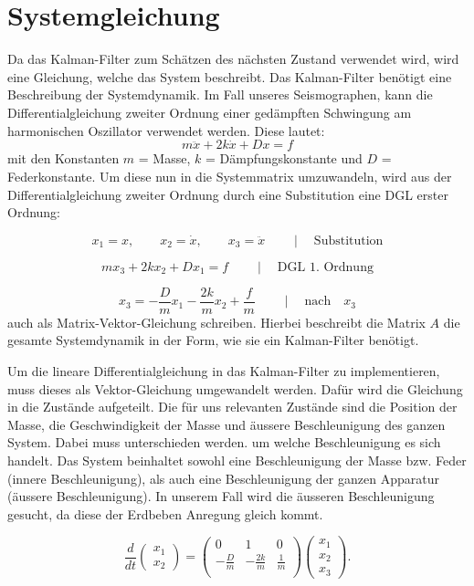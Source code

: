 \section{Systemgleichung}
Da das Kalman-Filter zum Schätzen des nächsten Zustand verwendet wird, wird eine Gleichung, welche das System beschreibt. Das Kalman-Filter benötigt eine Beschreibung der Systemdynamik. Im Fall unseres Seismographen, kann die Differentialgleichung zweiter Ordnung einer gedämpften Schwingung am harmonischen Oszillator verwendet werden. Diese lautet:
\begin{equation}
m\ddot x + 2k \dot x + Dx = f
\end{equation}
mit den Konstanten $m$ = Masse, $k$ = Dämpfungskonstante und $D$  = Federkonstante.
Um diese nun in die Systemmatrix umzuwandeln, wird aus der Differentialgleichung zweiter Ordnung durch eine Substitution eine DGL erster Ordnung:


\begin{equation}
{x_1}=x, \qquad
{x_2}=\dot x,  \qquad
{x_3}=\ddot x\qquad \mid \quad \text {Substitution}
\end{equation}


\begin{equation}
m{x_3}+ 2k{x_2} + D{x_1} = f\qquad \mid \quad \text {DGL 1. Ordnung}
\end{equation} 

\begin{equation}
{x_3}=-\frac{D}{m} {x_1} -\frac{2k}{m} {x_2} + \frac{f} {m}  \qquad \mid \quad \text {nach}  \quad{x_3} 
\end{equation} 
auch als Matrix-Vektor-Gleichung schreiben.
Hierbei beschreibt die Matrix $A$ die gesamte Systemdynamik in der Form, wie sie ein Kalman-Filter benötigt.

Um die lineare Differentialgleichung in das Kalman-Filter zu implementieren, muss dieses als Vektor-Gleichung umgewandelt werden. Dafür wird die Gleichung in die Zustände aufgeteilt. Die für uns relevanten Zustände sind die Position der Masse, die Geschwindigkeit der Masse und äussere Beschleunigung des ganzen System. Dabei muss unterschieden werden. um welche Beschleunigung es sich handelt. Das System beinhaltet sowohl eine Beschleunigung der Masse bzw. Feder (innere Beschleunigung), als auch eine Beschleunigung der ganzen Apparatur (äussere Beschleunigung). In unserem Fall wird die äusseren Beschleunigung gesucht, da diese der Erdbeben Anregung gleich kommt. 


\begin{equation}
\frac{d}{dt} \left(\begin{array}{c} {x_1} \\ {x_2}  \end{array}\right) = \left(
 \begin{array}{ccc} 	
0 & 1& 0 \\ 
- \frac{D}{m} &-\frac{2k}{m} & \frac{1} {m}\\
\end{array}\right)  \left(\begin{array}{c} {x_1} \\ {x_2} \\ {x_3} \end{array}\right).
\end{equation}


